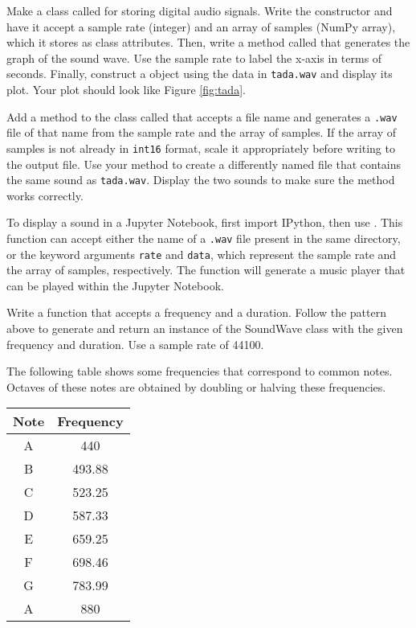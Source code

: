 
Make a class called  for storing digital audio signals.
Write the constructor and have it accept a sample rate (integer) and an array of samples (NumPy array), which it stores as class attributes.
Then, write a method called  that generates the graph of the sound wave.
Use the sample rate to label the x-axis in terms of seconds.
Finally, construct a  object using the data in \texttt{tada.wav} and display its plot.
Your plot should look like Figure \ref{fig:tada}.

Add a method to the  class called  that accepts a file name and generates a \texttt{.wav} file of that name from the sample rate and the array of samples.
If the array of samples is not already in \texttt{int16} format, scale it appropriately before writing to the output file.
Use your method to create a differently named file that contains the same sound as \texttt{tada.wav}.
Display the two sounds to make sure the method works correctly.
\begin{info}
To display a sound in a Jupyter Notebook, first import IPython, then use .
This function can accept either the name of a \texttt{.wav} file present in the same directory, or the keyword arguments \texttt{rate} and \texttt{data}, which represent the sample rate and the array of samples, respectively.
The function will generate a music player that can be played within the Jupyter Notebook.
\end{info}

Write a function that accepts a frequency and a duration.
Follow the pattern above to generate and return an instance of the SoundWave class with the given frequency and duration.
Use a sample rate of 44100.

The following table shows some frequencies that correspond to common notes.
Octaves of these notes are obtained by doubling or halving these frequencies.

\begin{center}
\begin{tabular}{|c|c|}
\hline
Note & Frequency \\
\hline
A & 440 \\
B & 493.88 \\
C & 523.25 \\
D & 587.33 \\
E & 659.25 \\
F & 698.46 \\
G & 783.99 \\
A & 880 \\
\hline
\end{tabular}
\end{center}

